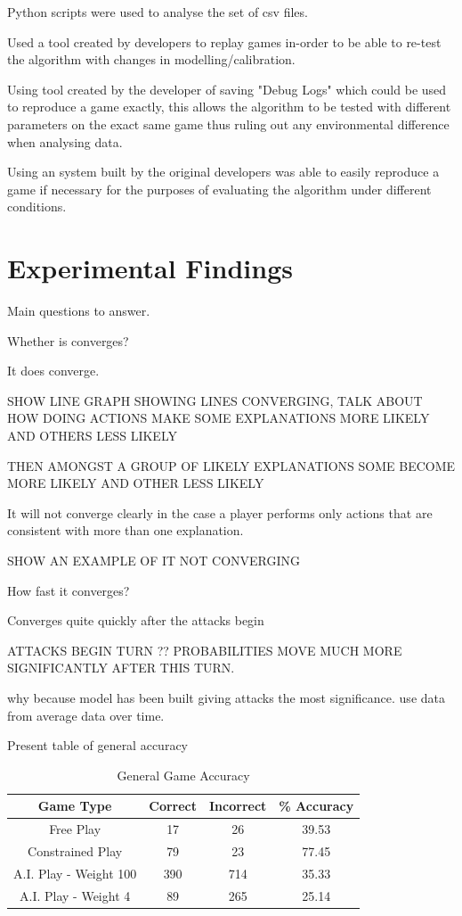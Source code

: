 \documentclass[parskip]{cs4rep}
\begin{document}
Python scripts were used to analyse the set of csv files.

Used a tool created by developers to replay games in-order to be able to re-test the algorithm with changes in modelling/calibration.

Using tool created by the developer of saving "Debug Logs" which could be used to reproduce a game exactly, this allows the algorithm to be tested with different parameters on the exact same game thus ruling out any environmental difference when analysing data.

Using an system built by the original developers was able to easily reproduce a game if necessary for the purposes of evaluating the algorithm under different conditions.

\section{Experimental Findings}

Main questions to answer.

Whether is converges?

It does converge.

SHOW LINE GRAPH SHOWING LINES CONVERGING, TALK ABOUT HOW DOING ACTIONS MAKE SOME EXPLANATIONS MORE LIKELY AND OTHERS LESS LIKELY

THEN AMONGST A GROUP OF LIKELY EXPLANATIONS SOME BECOME MORE LIKELY AND OTHER LESS LIKELY

It will not converge clearly in the case a player performs only actions that are consistent with more than one explanation.

SHOW AN EXAMPLE OF IT NOT CONVERGING

How fast it converges?

Converges quite quickly after the attacks begin

ATTACKS BEGIN TURN ?? PROBABILITIES MOVE MUCH MORE SIGNIFICANTLY AFTER THIS TURN.

why because model has been built giving attacks the most significance. use data from average data over time.

Present table of general accuracy

\begin{table}[ht]
\centering
\begin{tabular}{|c|c|c|c|}
\hline 
\textbf{Game Type} & \textbf{Correct} & \textbf{Incorrect} & \textbf{\% Accuracy} \\ 
\hline 
Free Play & 17 & 26 & 39.53 \\ 
\hline 
Constrained Play & 79 & 23 & 77.45 \\ 
\hline 
A.I. Play - Weight 100 & 390 & 714 & 35.33 \\ 
\hline 
A.I. Play - Weight 4 & 89 & 265 & 25.14 \\
\hline 
\end{tabular}
\caption{General Game Accuracy}
\label{table:general-game-accuracy}
\end{table}
\end{document}
